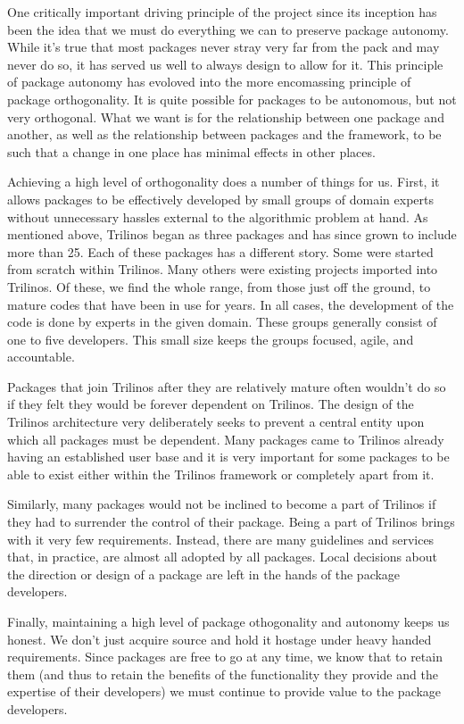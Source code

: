 \documentclass[12pt,relax]{article}
\begin{document}
One critically important driving principle of the project since its inception
has been the idea that we must do everything we can to preserve package
autonomy.  While it's true that most packages never stray very far from the
pack and may never do so, it has served us well to always design to allow for
it.  This principle of package autonomy has evoloved into the more
encomassing principle of package orthogonality.  It is quite possible for
packages to be autonomous, but not very orthogonal.  What we want is for the
relationship between one package and another, as well as the relationship
between packages and the framework, to be such that a change in one place has
minimal effects in other places.

Achieving a high level of orthogonality does a number of things for us.  First,
it allows packages to be effectively developed by small groups of domain
experts without unnecessary hassles external to the algorithmic problem at
hand.  As mentioned above, Trilinos began as three packages and has since
grown to include more than 25.  Each of these packages has a different story.  
Some were started from scratch within Trilinos.  Many others were existing
projects imported into Trilinos.  Of these, we find the whole range, from
those just off the ground, to mature codes that have been in use for years.
In all cases, the development of the code is done by experts in the given
domain.  These groups generally consist of one to five developers.  This
small size keeps the groups focused, agile, and accountable.
  
Packages that join Trilinos after they are relatively mature often wouldn't
do so if they felt they would be forever dependent on Trilinos.  The design
of the Trilinos architecture very deliberately seeks to prevent a central
entity upon which all packages must be dependent.  Many packages came to 
Trilinos already having an established user base and it is very important
for some packages to be able to exist either within the Trilinos framework
or completely apart from it.

Similarly, many packages would not be inclined to become a part of Trilinos
if they had to surrender the control of their package.  Being a part of
Trilinos brings with it very few requirements.  Instead, there are many
guidelines and services that, in practice, are almost all adopted by all
packages.  Local decisions about the direction or design of a package are
left in the hands of the package developers.

Finally, maintaining a high level of package othogonality and autonomy
keeps us honest.  We don't just acquire source and hold it hostage under heavy
handed requirements.  Since packages are free to go at any time, we know that
to retain them (and thus to retain the benefits of the functionality they
provide and the expertise of their developers) we must continue to provide
value to the package developers.
\end{document}
